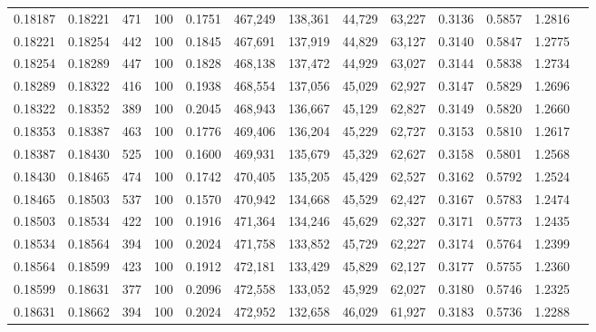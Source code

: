 \begin{tabular}{rrrrrrrrrrrrr}
0.18187 & 0.18221 &   471 & 100 &                                     0.1751 & 467,249 & 138,361 &  44,729 &  63,227 & 0.3136 & 0.5857 & 1.2816 \\
0.18221 & 0.18254 &   442 & 100 &                                     0.1845 & 467,691 & 137,919 &  44,829 &  63,127 & 0.3140 & 0.5847 & 1.2775 \\
0.18254 & 0.18289 &   447 & 100 &                                     0.1828 & 468,138 & 137,472 &  44,929 &  63,027 & 0.3144 & 0.5838 & 1.2734 \\
0.18289 & 0.18322 &   416 & 100 &                                     0.1938 & 468,554 & 137,056 &  45,029 &  62,927 & 0.3147 & 0.5829 & 1.2696 \\
0.18322 & 0.18352 &   389 & 100 &                                     0.2045 & 468,943 & 136,667 &  45,129 &  62,827 & 0.3149 & 0.5820 & 1.2660 \\
0.18353 & 0.18387 &   463 & 100 &                                     0.1776 & 469,406 & 136,204 &  45,229 &  62,727 & 0.3153 & 0.5810 & 1.2617 \\
0.18387 & 0.18430 &   525 & 100 &                                     0.1600 & 469,931 & 135,679 &  45,329 &  62,627 & 0.3158 & 0.5801 & 1.2568 \\
0.18430 & 0.18465 &   474 & 100 &                                     0.1742 & 470,405 & 135,205 &  45,429 &  62,527 & 0.3162 & 0.5792 & 1.2524 \\
0.18465 & 0.18503 &   537 & 100 &                                     0.1570 & 470,942 & 134,668 &  45,529 &  62,427 & 0.3167 & 0.5783 & 1.2474 \\
0.18503 & 0.18534 &   422 & 100 &                                     0.1916 & 471,364 & 134,246 &  45,629 &  62,327 & 0.3171 & 0.5773 & 1.2435 \\
0.18534 & 0.18564 &   394 & 100 &                                     0.2024 & 471,758 & 133,852 &  45,729 &  62,227 & 0.3174 & 0.5764 & 1.2399 \\
0.18564 & 0.18599 &   423 & 100 &                                     0.1912 & 472,181 & 133,429 &  45,829 &  62,127 & 0.3177 & 0.5755 & 1.2360 \\
0.18599 & 0.18631 &   377 & 100 &                                     0.2096 & 472,558 & 133,052 &  45,929 &  62,027 & 0.3180 & 0.5746 & 1.2325 \\
0.18631 & 0.18662 &   394 & 100 &                                     0.2024 & 472,952 & 132,658 &  46,029 &  61,927 & 0.3183 & 0.5736 & 1.2288 \\

\end{tabular}
